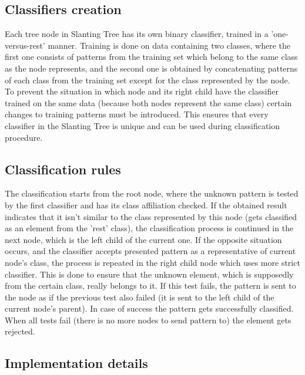\subsection{Classifiers creation}

Each tree node in Slanting Tree has its own binary classifier, trained in a 'one-versus-rest' manner. Training is done on data containing two classes, where the first one consists of patterns from the training set which belong to the same class as the node represents, and the second one is obtained by concatenating patterns of each class from the training set except for the class represented by the node. To prevent the situation in which node and its right child have the classifier trained on the same data (because both nodes represent the same class) certain changes to training patterns must be introduced. This ensures that every classifier in the Slanting Tree is unique and can be used during classification procedure.


\subsection{Classification rules}

The classification starts from the root node, where the unknown pattern is tested by the first classifier and has its class affiliation checked. If the obtained result indicates that it isn't similar to the class represented by this node (gets classified as an element from the 'rest' class), the classification process is continued in the next node, which is the left child of the current one. If the opposite situation occurs, and the classifier accepts presented pattern as a representative of current node's class, the process is repeated in the right child node which uses more strict classifier. This is done to ensure that the unknown element, which is supposedly from the certain class, really belongs to it. If this test fails, the pattern is sent to the node as if the previous test also failed (it is sent to the left child of the current node's parent). In case of success the pattern gets successfully classified. When all tests fail (there is no more nodes to send pattern to) the element gets rejected.

\subsection{Implementation details}

